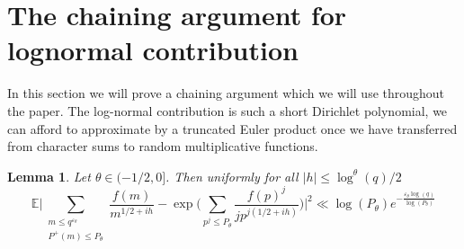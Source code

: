 \documentclass[reqno]{amsart}
\newtheorem{lemma}{Lemma}
\theoremstyle{definition}
\theoremstyle{remark}
\numberwithin{equation}{section}
\theoremstyle{remark}
\begin{document}
\section{The chaining argument for lognormal contribution} \label{chain_arg}
In this section we will prove a chaining argument which we will use throughout the paper. The log-normal contribution is such a short Dirichlet polynomial, we can afford to approximate by a truncated Euler product once we have transferred from character sums to random multiplicative functions. 
\begin{lemma}
    Let $\theta \in (-1/2,0]$. Then uniformly for all $|h| \leq \log^{\theta}(q)/2$
    \begin{equation}
        \mathbb{E}\big|\sum_{\substack{m \leq q^{\varepsilon_\theta} \\ P^+(m) \leq P_\theta}}\frac{f(m)}{m^{1/2+ih}} - \exp\big(\sum_{p^j \leq P_\theta}\frac{f(p)^j}{jp^{j(1/2+ih)}}\big)\big|^2\ll \log(P_\theta)e^{-\frac{\varepsilon_\theta \log(q)}{\log(P_\theta)}} \label{exp_log_eq}
    \end{equation} 
    \label{exp_logn}
\end{lemma}
\end{document}
